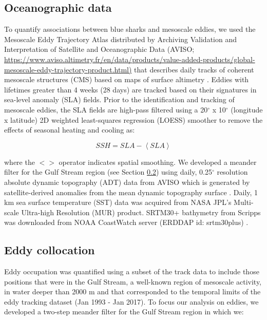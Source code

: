 \subsection{Oceanographic data}

To quantify associations between blue sharks and mesoscale eddies, we used the Mesoscale Eddy Trajectory Atlas distributed by Archiving Validation and Interpretation of Satellite and Oceanographic Data (AVISO; \href{https://www.aviso.altimetry.fr/en/data/products/value-added-products/global-mesoscale-eddy-trajectory-product.html}{https://www.aviso.altimetry.fr/en/data/products/value-added-products/global-mesoscale-eddy-trajectory-product.html)} that describes daily tracks of coherent mesoscale structures (CMS) based on maps of surface altimetry \citep{Chelton2011}. Eddies with lifetimes greater than 4 weeks (28 days) are tracked based on their signatures in sea-level anomaly (SLA) fields. Prior to the identification and tracking of mesoscale eddies, the SLA fields are high-pass filtered using a 20$^\circ$ x 10$^\circ$ (longitude x latitude) 2D weighted least-squares regression (LOESS) smoother to remove the effects of seasonal heating and cooling \citep{Chelton2011} as:

\begin{equation}
SSH = SLA - \left<SLA\right>
\label{eq:a5ssh}
\end{equation}

where the $<>$ operator indicates spatial smoothing. We developed a meander filter for the Gulf Stream region (see Section \ref{sec:a5eddycoll}) using daily, 0.25$^\circ$ resolution absolute dynamic topography (ADT) data from AVISO which is generated by satellite-derived anomalies from the mean dynamic topography surface \citep{Rio2011}. Daily, 1 km sea surface temperature (SST) data was acquired from NASA JPL's Multi-scale Ultra-high Resolution (MUR) product. SRTM30+ bathymetry from Scripps was downloaded from NOAA CoastWatch server (ERDDAP id: srtm30plus) \citep{Becker2009}.

\subsection{Eddy collocation} \label{sec:a5eddycoll}

Eddy occupation was quantified using a subset of the track data to include those positions that were in the Gulf Stream, a well-known region of mesoscale activity, in water deeper than 2000 m and that corresponded to the temporal limits of the eddy tracking dataset (Jan 1993 - Jan 2017). To focus our analysis on eddies, we developed a two-step meander filter for the Gulf Stream region \citep{Gaube2017DSR} in which we: 

